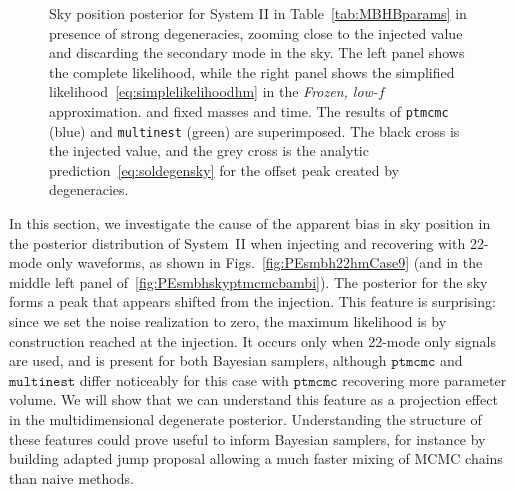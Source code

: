 \documentclass[aps,showpacs,twocolumn,prd,superscriptaddress,nofootinbib]{revtex4-1}
\begin{document}
\begin{figure}
\begin{minipage}{.49\linewidth}
  \end{minipage}
  \caption{Sky position posterior for System II in Table~\ref{tab:MBHBparams} in presence of strong degeneracies, zooming close to the injected value and discarding the secondary mode in the sky. The left panel shows the complete likelihood, while the right panel shows the simplified likelihood~\eqref{eq:simplelikelihoodhm} in the \textit{Frozen, low-$f$} approximation. and fixed masses and time. The results of \texttt{ptmcmc} (blue) and \texttt{multinest} (green) are superimposed. The black cross is the injected value, and the grey cross is the analytic prediction~\eqref{eq:soldegensky} for the offset peak created by degeneracies.}
  \label{fig:Skydownsmbh22hmSimpleLikeCase9}
\end{figure}

In this section, we investigate the cause of the apparent bias in sky position in the posterior distribution of System~II when injecting and recovering with 22-mode only waveforms, as shown in Figs.~\ref{fig:PEsmbh22hmCase9} (and in the middle left panel of~\ref{fig:PEsmbhskyptmcmcbambi}). The posterior for the sky forms a peak that appears shifted from the injection. This feature is surprising: since we set the noise realization to zero, the maximum likelihood is by construction reached at the injection. It occurs only when 22-mode only signals are used, and is present for both Bayesian samplers, although $\texttt{ptmcmc}$ and $\texttt{multinest}$ differ noticeably for this case with $\texttt{ptmcmc}$ recovering more parameter volume. We will show that we can understand this feature as a projection effect in the multidimensional degenerate posterior. Understanding the structure of these features could prove useful to inform Bayesian samplers, for instance by building adapted jump proposal allowing a much faster mixing of MCMC chains than naive methods.
\end{document}
